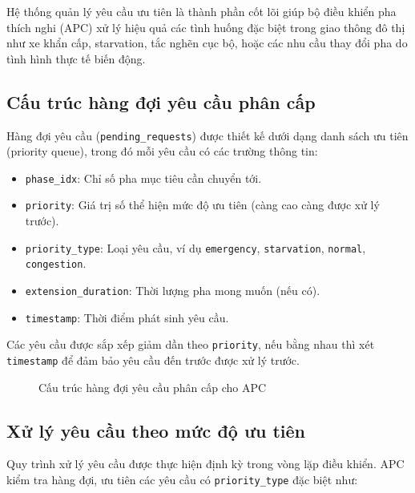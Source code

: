 Hệ thống quản lý yêu cầu ưu tiên là thành phần cốt lõi giúp bộ điều khiển pha thích nghi (APC) xử lý hiệu quả các tình huống đặc biệt trong giao thông đô thị như xe khẩn cấp, starvation, tắc nghẽn cục bộ, hoặc các nhu cầu thay đổi pha do tình hình thực tế biến động.

\subsection{Cấu trúc hàng đợi yêu cầu phân cấp}

Hàng đợi yêu cầu (\texttt{pending\_requests}) được thiết kế dưới dạng danh sách ưu tiên (priority queue), trong đó mỗi yêu cầu có các trường thông tin:

\begin{itemize}
    \item \texttt{phase\_idx}: Chỉ số pha mục tiêu cần chuyển tới.
    \item \texttt{priority}: Giá trị số thể hiện mức độ ưu tiên (càng cao càng được xử lý trước).
    \item \texttt{priority\_type}: Loại yêu cầu, ví dụ \texttt{emergency}, \texttt{starvation}, \texttt{normal}, \texttt{congestion}.
    \item \texttt{extension\_duration}: Thời lượng pha mong muốn (nếu có).
    \item \texttt{timestamp}: Thời điểm phát sinh yêu cầu.
\end{itemize}

Các yêu cầu được sắp xếp giảm dần theo \texttt{priority}, nếu bằng nhau thì xét \texttt{timestamp} để đảm bảo yêu cầu đến trước được xử lý trước.

\begin{figure}[H]
    \centering
    \caption{Cấu trúc hàng đợi yêu cầu phân cấp cho APC}
    \label{fig:priority_queue_diagram}
\end{figure}

\subsection{Xử lý yêu cầu theo mức độ ưu tiên}

Quy trình xử lý yêu cầu được thực hiện định kỳ trong vòng lặp điều khiển. APC kiểm tra hàng đợi, ưu tiên các yêu cầu có \texttt{priority\_type} đặc biệt như:

